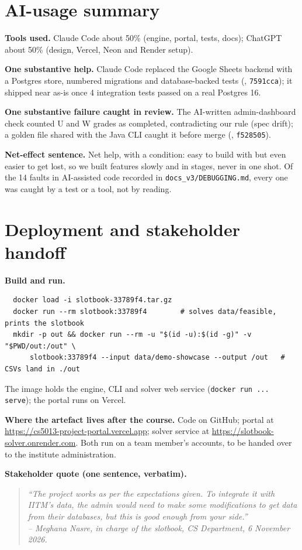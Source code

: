 \documentclass[11pt,a4paper]{article}
\begin{document}
\section{AI-usage summary}

\textbf{Tools used.}
Claude Code about 50\% (engine, portal, tests, docs); ChatGPT about 50\% (design, Vercel, Neon and Render setup).

\textbf{One substantive help.}
Claude Code replaced the Google Sheets backend with a Postgres store, numbered migrations and database-backed tests (, \texttt{7591cca}); it shipped near as-is once 4 integration tests passed on a real Postgres 16.

\textbf{One substantive failure caught in review.}
The AI-written admin-dashboard check counted U and W grades as completed, contradicting our rule (spec drift); a golden file shared with the Java CLI caught it before merge (, \texttt{f528505}).

\textbf{Net-effect sentence.}
Net help, with a condition: easy to build with but even easier to get lost, so we built features slowly and in stages, never in one shot. Of the 14 faults in AI-assisted code recorded in \texttt{docs\_v3/DEBUGGING.md}, every one was caught by a test or a tool, not by reading.

\section{Deployment and stakeholder handoff}

\textbf{Build and run.}
\begin{verbatim}
  docker load -i slotbook-33789f4.tar.gz
  docker run --rm slotbook:33789f4        # solves data/feasible, prints the slotbook
  mkdir -p out && docker run --rm -u "$(id -u):$(id -g)" -v "$PWD/out:/out" \
      slotbook:33789f4 --input data/demo-showcase --output /out   # CSVs land in ./out
\end{verbatim}
\vspace{-0.5em}
The image holds the engine, CLI and solver web service (\texttt{docker run ... serve}); the portal runs on Vercel.

\textbf{Where the artefact lives after the course.}
Code on GitHub; portal at \url{https://cs5013-project-portal.vercel.app}; solver service at \url{https://slotbook-solver.onrender.com}.
Both run on a team member's accounts, to be handed over to the institute administration.

\textbf{Stakeholder quote (one sentence, verbatim).}
\begin{quote}
\textit{``The project works as per the expectations given. To integrate it with IITM's data, the admin would need to make some modifications to get data from their databases, but this is good enough from your side.''\\
-- Meghana Nasre, in charge of the slotbook, CS Department, 6 November 2026.}
\end{quote}
\end{document}
